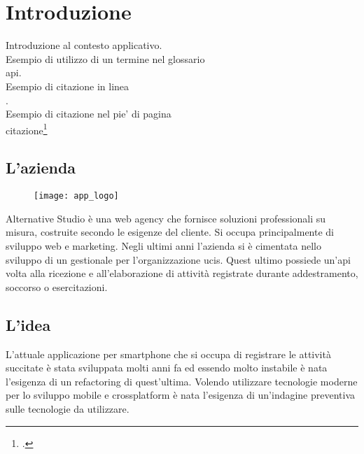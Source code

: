 
\chapter{Introduzione}
\label{cap:introduzione}

Introduzione al contesto applicativo.\\

\noindent Esempio di utilizzo di un termine nel glossario \\
\gls{api}. \\

\noindent Esempio di citazione in linea \\
\cite{site:agile-manifesto}. \\

\noindent Esempio di citazione nel pie' di pagina \\
citazione\footcite{womak:lean-thinking} \\

\section{L'azienda}

\begin{figure}[htbp]
\begin{center}
\texttt{[image: app\_logo]}
\end{center}
\end{figure}

Alternative Studio è una web agency che fornisce soluzioni professionali su misura, costruite secondo le esigenze del cliente. Si occupa principalmente di sviluppo web e marketing. Negli ultimi anni l'azienda si è cimentata nello sviluppo di un gestionale per l'organizzazione \gls{ucis}. Quest ultimo possiede un'\gls{api} volta alla ricezione e all'elaborazione di attività registrate durante addestramento, soccorso o esercitazioni.

\section{L'idea}

L'attuale applicazione per smartphone che si occupa di registrare le attività succitate è stata sviluppata molti anni fa ed essendo molto instabile è nata l'esigenza di un refactoring di quest'ultima. Volendo utilizzare tecnologie moderne per lo sviluppo mobile e crossplatform è nata l'esigenza di un'indagine preventiva sulle tecnologie da utilizzare.

